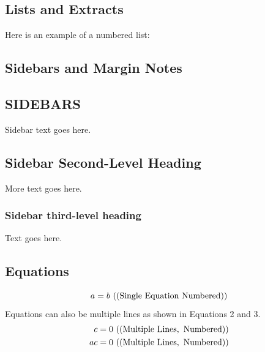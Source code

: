 \documentclass[letterpaper]{ar-1col}
\begin{document}
\subsection{Lists and Extracts} Here is an example of a numbered list:


\subsection{Sidebars and Margin Notes}
\begin{marginnote}[]
\end{marginnote}

\begin{textbox}[h]\section{SIDEBARS}
Sidebar text goes here.
\subsection{Sidebar Second-Level Heading}
More text goes here.\subsubsection{Sidebar third-level heading}
Text goes here.\end{textbox}



\subsection{Equations}
\begin{equation}
a = b \ {\rm ((Single\ Equation\ Numbered))}
\end{equation}
Equations can also be multiple lines as shown in Equations 2 and 3.
\begin{eqnarray}
c = 0 \ {\rm ((Multiple\  Lines, \ Numbered))}\\
ac = 0 \ {\rm ((Multiple \ Lines, \ Numbered))}
\end{eqnarray}
\end{document}
